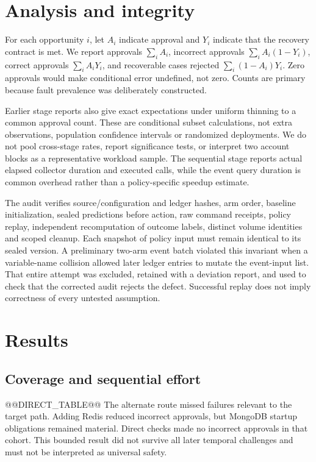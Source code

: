 \documentclass[manuscript,review,nonacm]{acmart}
\begin{document}
\section{Analysis and integrity}
For each opportunity $i$, let $A_i$ indicate approval and $Y_i$ indicate that the recovery contract is met. We report approvals $\sum_i A_i$, incorrect approvals $\sum_i A_i(1-Y_i)$, correct approvals $\sum_i A_iY_i$, and recoverable cases rejected $\sum_i(1-A_i)Y_i$. Zero approvals would make conditional error undefined, not zero. Counts are primary because fault prevalence was deliberately constructed.

Earlier stage reports also give exact expectations under uniform thinning to a common approval count. These are conditional subset calculations, not extra observations, population confidence intervals or randomized deployments. We do not pool cross-stage rates, report significance tests, or interpret two account blocks as a representative workload sample. The sequential stage reports actual elapsed collector duration and executed calls, while the event query duration is common overhead rather than a policy-specific speedup estimate.

The audit verifies source/configuration and ledger hashes, arm order, baseline initialization, sealed predictions before action, raw command receipts, policy replay, independent recomputation of outcome labels, distinct volume identities and scoped cleanup. Each snapshot of policy input must remain identical to its sealed version. A preliminary two-arm event batch violated this invariant when a variable-name collision allowed later ledger entries to mutate the event-input list. That entire attempt was excluded, retained with a deviation report, and used to check that the corrected audit rejects the defect. Successful replay does not imply correctness of every untested assumption.

\section{Results}
\subsection{Coverage and sequential effort}
@@DIRECT_TABLE@@
The alternate route missed failures relevant to the target path. Adding Redis reduced incorrect approvals, but MongoDB startup obligations remained material. Direct checks made no incorrect approvals in that cohort. This bounded result did not survive all later temporal challenges and must not be interpreted as universal safety.
\end{document}

